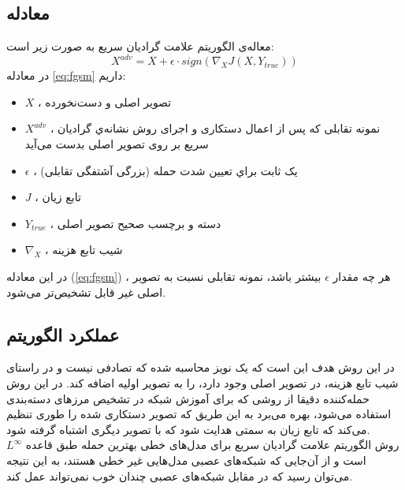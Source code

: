 \subsection{معادله} 
معاله‌ی الگوریتم علامت گرادیان سریع به صورت زیر است: 
\begin{equation} \label{eq:fgsm}
	X^{adv} = X + \epsilon \cdot sign(\nabla_XJ(X, Y_{true}))
\end{equation}
در معادله
\ref{eq:fgsm} 
داریم:
\begin{itemize}
	\item $X$
	، تصویر اصلی و دست‌نخورده
	\item $X^{adv}$
	، نمونه تقابلی که پس از اعمال دستکاری و اجرای روش نشانه‌ي گرادیان سریع بر روی تصویر اصلی بدست می‌آید
	\item $\epsilon$
	 ، یک ثابت براي تعیین شدت حمله (بزرگی آشتفگی تقابلی)
	\item $J$
	 ، تابع زیان
	\item $Y_{true}$
	، دسته و برچسب صحیح تصویر اصلی
	\item $\nabla_X$
	، شیب تابع هزینه
\end{itemize}

در این معادله
(\ref{eq:fgsm}) 
، هر چه مقدار $\epsilon$ بیشتر باشد، نمونه‌ تقابلی نسبت به تصویر اصلی غیر قابل تشخیص‌تر می‌شود.

\subsection{عملکرد الگوریتم}

در این روش هدف این است که یک نویز محاسبه شده که تصادفی نیست و در راستای شیب تابع هزینه، در تصویر اصلی وجود دارد، را به تصویر اولیه اضافه کند. 
در این روش حمله‌کننده دقیقا از روشی که برای آموزش شبکه در تشخیص مرز‌های دسته‌بندی استفاده می‌شود، بهره می‌برد به این طریق که تصویر دستکاری شده را طوری تنظیم می‌کند که تابع زیان به سمتی هدایت شود که با تصویر دیگری اشتباه گرفته شود.
\\
روش الگوریتم علامت گرادیان سریع برای مدل‌های خطی بهترین حمله طبق قاعده
$L^{\infty}$
است و از‌ آن‌جایی که شبکه‌های عصبی مدل‌هایی غیر خطی هستند، به این نتیجه‌ می‌توان رسید که در مقابل شبکه‌های عصبی چندان خوب نمی‌تواند عمل کند.

